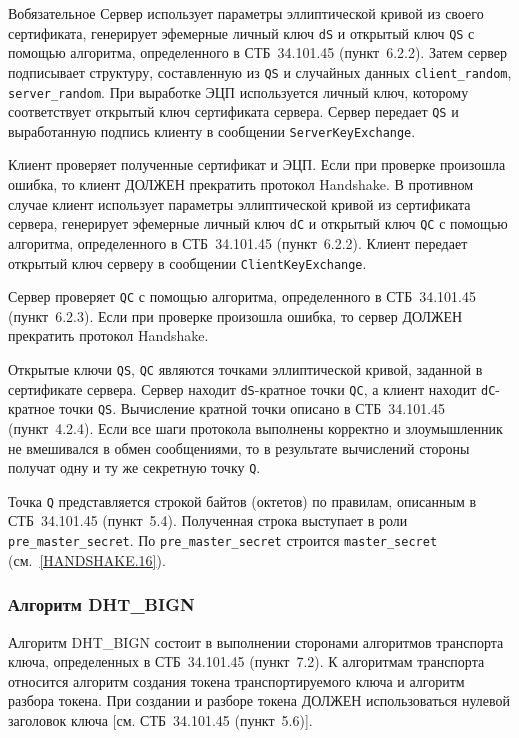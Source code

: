 \begin{appendix}{В}{обязательное}
Сервер использует параметры эллиптической кривой из своего сертификата, 
генерирует эфемерные личный ключ \lstinline{dS} и открытый ключ 
\lstinline{QS} с помощью алгоритма, определенного в СТБ~34.101.45 
(пункт~6.2.2). Затем сервер подписывает структуру, составленную из 
\lstinline{QS} и случайных данных \lstinline{client_random}, 
\lstinline{server_random}. При выработке ЭЦП используется личный ключ,  
которому соответствует открытый ключ сертификата сервера. Сервер передает 
\lstinline{QS} и выработанную подпись клиенту в сообщении 
\lstinline{ServerKeyExchange}.   

Клиент проверяет полученные сертификат и ЭЦП. Если при проверке произошла 
ошибка, то клиент ДОЛЖЕН прекратить протокол Handshake. В противном случае 
клиент использует параметры эллиптической кривой из сертификата сервера, 
генерирует эфемерные личный ключ \lstinline{dC} и открытый ключ 
\lstinline{QC} с помощью алгоритма, определенного в СТБ~34.101.45 
(пункт~6.2.2). Клиент передает открытый ключ серверу в сообщении 
\lstinline{ClientKeyExchange}.  

Сервер проверяет \lstinline{QC} с помощью алгоритма, определенного в СТБ~34.101.45 
(пункт~6.2.3). Если при проверке произошла ошибка, то сервер ДОЛЖЕН прекратить 
протокол Handshake. 

Открытые ключи \lstinline{QS}, \lstinline{QC} являются точками 
эллиптической кривой, заданной в сертификате сервера. Сервер находит 
\lstinline{dS}-кратное точки \lstinline{QC}, а клиент находит 
\lstinline{dC}-кратное точки \lstinline{QS}. Вычисление кратной точки 
описано в СТБ~34.101.45 (пункт~4.2.4). Если все шаги протокола выполнены 
корректно и злоумышленник не вмешивался в обмен сообщениями, то в 
результате вычислений стороны получат одну и ту же секретную точку \lstinline{Q}.  

Точка \lstinline{Q} представляется строкой байтов (октетов) по правилам, 
описанным в СТБ~34.101.45 (пункт~5.4). Полученная строка выступает в роли 
\lstinline{pre_master_secret}. По \lstinline{pre_master_secret} строится 
\lstinline{master_secret} (см.~\ref{HANDSHAKE.16}). 

\subsubsection{Алгоритм DHT\_BIGN}\label{BSUITES.2.3.2}

Алгоритм DHT\_BIGN состоит в выполнении сторонами алгоритмов транспорта 
ключа, определенных в  СТБ~34.101.45 (пункт~7.2). К алгоритмам транспорта 
относится алгоритм создания токена транспортируемого ключа и алгоритм 
разбора токена. При создании и разборе токена ДОЛЖЕН использоваться 
нулевой заголовок ключа [см. СТБ~34.101.45 (пункт~5.6)]. 


\end{appendix}
